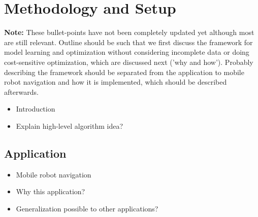 \chapter{Methodology and Setup}
\label{ch:setup}




\textbf{Note:} These bullet-points have not been completely updated yet although most are still relevant. Outline should be such that we first discuss the framework for model learning and optimization without considering incomplete data or doing cost-sensitive optimization, which are discussed next ('why and how').
Probably describing the framework should be separated from the application to mobile robot navigation and how it is implemented, which should be described afterwards.

\begin{itemize}
	\item Introduction
	\item Explain high-level algorithm idea?
\end{itemize}

\section{Application}
\label{sec:application}

% 

\begin{itemize}
	\item Mobile robot navigation
	\item Why this application?
	\item Generalization possible to other applications?
\end{itemize}

